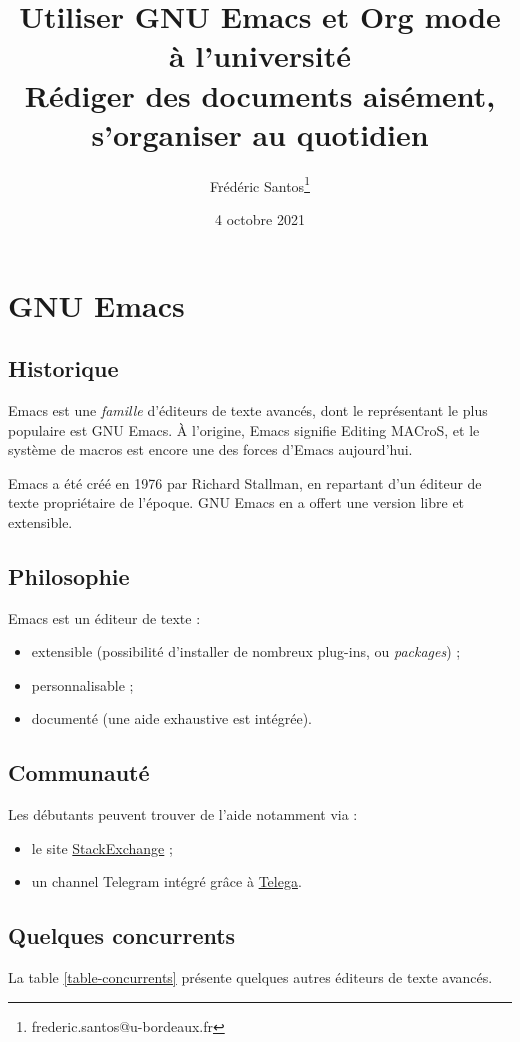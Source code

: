 \documentclass[11pt]{article}
\author{Frédéric Santos\thanks{frederic.santos@u-bordeaux.fr}}
\date{4 octobre 2021}
\title{Utiliser GNU Emacs et Org mode à l'université\\\medskip
\large Rédiger des documents aisément, s'organiser au quotidien}
\begin{document}
\maketitle
\tableofcontents


\section{GNU Emacs}
\label{sec:orgff1a928}
\subsection{Historique}
\label{sec:org507bfda}
Emacs est une \emph{famille} d'éditeurs de texte avancés, dont le représentant le plus populaire est GNU Emacs. À l'origine, \og Emacs\fg{} signifie \og Editing MACroS\fg{}, et le système de macros est encore une des forces d'Emacs aujourd'hui.

Emacs a été créé en 1976 par Richard Stallman, en repartant d'un éditeur de texte propriétaire de l'époque. GNU Emacs en a offert une version libre et extensible.

\subsection{Philosophie}
\label{sec:org0dce3ea}
Emacs est un éditeur de texte :
\begin{itemize}
\item extensible (possibilité d'installer de nombreux plug-ins, ou \emph{packages}) ;
\item personnalisable ;
\item documenté (une aide exhaustive est intégrée).
\end{itemize}

\subsection{Communauté}
\label{sec:org031ad94}
Les débutants peuvent trouver de l'aide notamment via :
\begin{itemize}
\item le site \href{https://emacs.stackexchange.com/}{StackExchange} ;
\item un channel Telegram intégré grâce à \href{https://zevlg.github.io/telega.el/}{Telega}.
\end{itemize}

\subsection{Quelques concurrents}
\label{sec:orgeac4036}
La table \ref{table-concurrents} présente quelques autres éditeurs de texte avancés.
\end{document}
